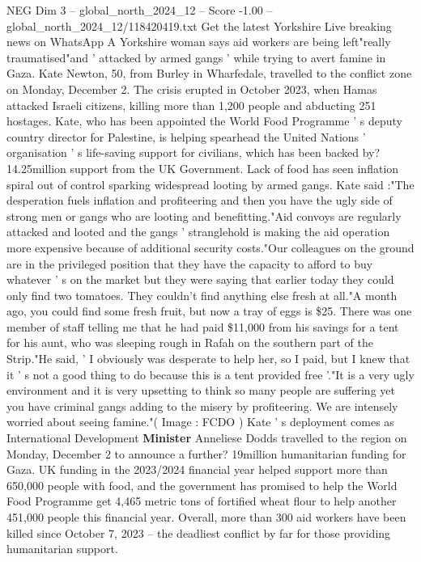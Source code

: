 \begin{textsample}{NEG Dim 3 – global\_north\_2024\_12 – Score -1.00 – global\_north\_2024\_12/118420419.txt}  \label{ex:f3_neg_227}
Get the latest Yorkshire Live breaking news on WhatsApp A Yorkshire woman says aid workers are being left"really traumatised"and ' attacked by armed gangs ' while trying to avert famine in Gaza.
Kate Newton, 50, from Burley in Wharfedale, travelled to the conflict zone on Monday, December 2.
The crisis erupted in October 2023, when Hamas attacked Israeli citizens, killing more than 1,200 people and abducting 251 hostages.
Kate, who has been appointed the World Food Programme ' s deputy country director for Palestine, is helping spearhead the United Nations ' organisation ' s life-saving support for civilians, which has been backed by? 14.25million support from the UK Government.
Lack of food has seen inflation spiral out of control sparking widespread looting by armed gangs.
Kate said :"The desperation fuels inflation and profiteering and then you have the ugly side of strong men or gangs who are looting and benefitting."Aid convoys are regularly attacked and looted and the gangs ' stranglehold is making the aid operation more expensive because of additional security costs."Our colleagues on the ground are in the privileged position that they have the capacity to afford to buy whatever ' s on the market but they were saying that earlier today they could only find two tomatoes.
They couldn't find anything else fresh at all."A month ago, you could find some fresh fruit, but now a tray of eggs is \$25.
There was one member of staff telling me that he had paid \$11,000 from his savings for a tent for his aunt, who was sleeping rough in Rafah on the southern part of the Strip."He said, ' I obviously was desperate to help her, so I paid, but I knew that it ' s not a good thing to do because this is a tent provided free '."It is a very ugly environment and it is very upsetting to think so many people are suffering yet you have criminal gangs adding to the misery by profiteering.
We are intensely worried about seeing famine."( Image : FCDO ) Kate ' s deployment comes as International Development \textbf{Minister} Anneliese Dodds travelled to the region on Monday, December 2 to announce a further? 19million humanitarian funding for Gaza.
UK funding in the 2023/2024 financial year helped support more than 650,000 people with food, and the government has promised to help the World Food Programme get 4,465 metric tons of fortified wheat flour to help another 451,000 people this financial year.
Overall, more than 300 aid workers have been killed since October 7, 2023 -- the deadliest conflict by far for those providing humanitarian support.

\end{textsample}
